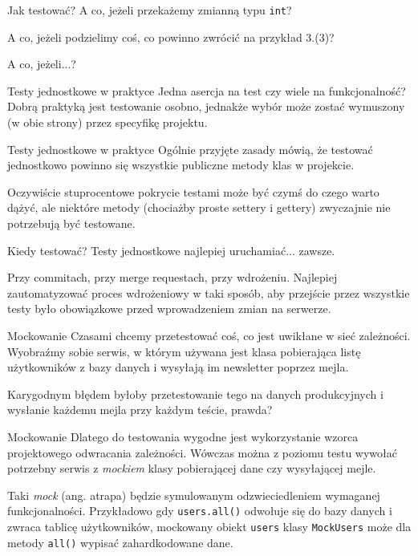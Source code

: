 \begin{frame}[fragile]{Jak testować?}
	A co, jeżeli przekażemy zmianną typu \texttt{int}?
	
	A co, jeżeli podzielimy coś, co powinno zwrócić na przykład 3.(3)?
	
	A co, jeżeli...?
\end{frame}

\begin{frame}{Testy jednostkowe w praktyce}
	Jedna asercja na test czy wiele na funkcjonalność? Dobrą praktyką jest testowanie osobno, jednakże wybór może zostać wymuszony (w obie strony) przez specyfikę projektu.
\end{frame}

\begin{frame}{Testy jednostkowe w praktyce}
	Ogólnie przyjęte zasady mówią, że testować jednostkowo powinno się wszystkie publiczne metody klas w projekcie.
	
	Oczywiście stuprocentowe pokrycie testami może być czymś do czego warto dążyć, ale niektóre metody (chociażby proste settery i gettery) zwyczajnie nie potrzebują być testowane.
\end{frame}

\begin{frame}{Kiedy testować?}
	Testy jednostkowe najlepiej uruchamiać... zawsze. 
	
	Przy commitach, przy merge requestach, przy wdrożeniu. Najlepiej zautomatyzować proces wdrożeniowy w taki sposób, aby przejście przez wszystkie testy było obowiązkowe przed wprowadzeniem zmian na serwerze.
\end{frame}

\begin{frame}{Mockowanie}
	Czasami chcemy przetestować coś, co jest uwikłane w sieć zależności. Wyobraźmy sobie serwis, w którym używana jest klasa pobierająca listę użytkowników z bazy danych i wysyłają im newsletter poprzez mejla.
	
	Karygodnym błędem byłoby przetestowanie tego na danych produkcyjnych i wysłanie każdemu mejla przy każdym teście, prawda?
\end{frame}

\begin{frame}{Mockowanie}
	Dlatego do testowania wygodne jest wykorzystanie wzorca projektowego odwracania zależności. Wówczas można z poziomu testu wywołać potrzebny serwis z \emph{mockiem} klasy pobierającej dane czy wysyłającej mejle.
	
	Taki \emph{mock} (ang. atrapa) będzie symulowanym odzwieciedleniem wymaganej funkcjonalności. Przykładowo gdy \texttt{users.all()} odwołuje się do bazy danych i zwraca tablicę użytkowników, mockowany obiekt \texttt{users} klasy \texttt{MockUsers} może dla metody \texttt{all()} wypisać zahardkodowane dane.
\end{frame}

